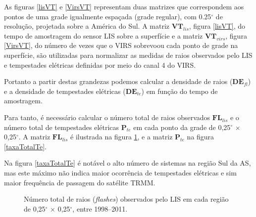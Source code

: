 As figuras  \ref{lisVT} e \ref{VirsVT} representam duas matrizes que correspondem aos pontos de uma grade igualmente espaçada (grade regular), com 0.25$^{\circ}$ de resolução, projetada sobre a América do Sul. A matriz $\mathbf{VT}_{lis}$, figura \ref{lisVT}, do tempo de amostragem do sensor LIS sobre a superfície e a matriz $\mathbf{VT}_{virs}$, figura \ref{VirsVT}, do número de vezes que o VIRS sobrevoou cada ponto de grade na superfície, são utilizadas para normalizar as medidas de raios observados pelo LIS e tempestades elétricas definidas por meio do  canal 4 do VIRS.  


Portanto a partir destas grandezas podemos calcular a densidade de raios ($\mathbf{DE}_{fl}$) e a densidade de tempestades elétricas ($\mathbf{DE}_{te}$) em função do tempo de amostragem.

Para tanto, é necessário calcular o número total de raios observados $\mathbf{FL}_{lis}$ e o número total de tempestades elétricas $\mathbf{P}_{te}$ em cada ponto da grade de 0,25$^{\circ}$ $\times$ 0,25$^{\circ}$. A matriz $\mathbf{FL}_{lis}$ é ilustrada na figura \ref{taxatotalraios}, e a matriz $\mathbf{P}_{te}$ na figura \ref{taxaTotalTe}.


Na figura \ref{taxaTotalTe} é notável o alto número de sistemas na região Sul da AS, mas este máximo não indica maior ocorrência de tempestades elétricas e sim maior frequência de passagem do satélite TRMM. 


\begin{figure}[!ht]
  \centering
\caption{Número total de raios (\textit{flashes}) observados pelo LIS em cada região de 0,25$^{\circ}$  $\times$ 0,25$^{\circ}$,  entre 1998--2011.}
\label{taxatotalraios}
\end{figure}   
  

